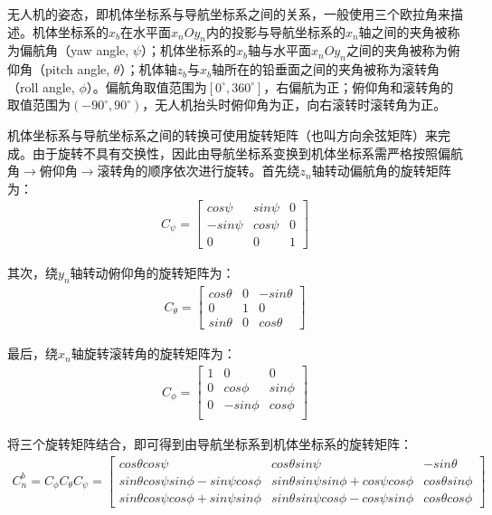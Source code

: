 无人机的姿态，即机体坐标系与导航坐标系之间的关系，一般使用三个欧拉角来描述。机体坐标系的$x_b$在水平面$x_n O y_n$内的投影与导航坐标系的$x_n$轴之间的夹角被称为偏航角（yaw angle, $\psi$）；机体坐标系的$x_b$轴与水平面$x_n O y_n$之间的夹角被称为俯仰角（pitch angle, $\theta$）；机体轴$z_b$与$x_b$轴所在的铅垂面之间的夹角被称为滚转角（roll angle, $\phi$）。偏航角取值范围为$[0^{\circ}, 360^{\circ}]$，右偏航为正；俯仰角和滚转角的取值范围为$(-90^{\circ}, 90^{\circ})$，无人机抬头时俯仰角为正，向右滚转时滚转角为正。

机体坐标系与导航坐标系之间的转换可使用旋转矩阵（也叫方向余弦矩阵）来完成。由于旋转不具有交换性，因此由导航坐标系变换到机体坐标系需严格按照偏航角$\rightarrow$俯仰角$\rightarrow$滚转角的顺序依次进行旋转。首先绕$z_n$轴转动偏航角的旋转矩阵为：
%
\begin{eqnarray}
C_\psi =
\begin{bmatrix}
cos\psi & sin\psi & 0 \\
-sin\psi & cos\psi & 0 \\
0 & 0 & 1
\end{bmatrix}
\end{eqnarray}

其次，绕$y_n$轴转动俯仰角的旋转矩阵为：
%
\begin{eqnarray}
C_\theta =
\begin{bmatrix}
cos\theta & 0 & -sin\theta \\
0 & 1 & 0 \\
sin\theta & 0 & cos\theta
\end{bmatrix}
\end{eqnarray}

最后，绕$x_n$轴旋转滚转角的旋转矩阵为：
%
\begin{eqnarray}
C_\phi =
\begin{bmatrix}
1 & 0 & 0 \\
0 & cos\phi & sin\phi \\
0 & -sin\phi & cos\phi \\
\end{bmatrix}
\end{eqnarray}

将三个旋转矩阵结合，即可得到由导航坐标系到机体坐标系的旋转矩阵：
%
\begin{eqnarray}
C_n^b = C_\phi C_\theta C_\psi =
\begin{bmatrix}
cos\theta cos\psi & cos\theta sin\psi & -sin\theta \\
sin\theta cos\psi sin\phi - sin\psi cos\phi & sin\theta sin\psi sin\phi + cos\psi cos\phi & cos\theta sin\phi \\
sin\theta cos\psi cos\phi + sin\psi sin\phi & sin\theta sin\psi cos\phi - cos\psi sin\phi & cos\theta cos\phi
\end{bmatrix}
\end{eqnarray}

